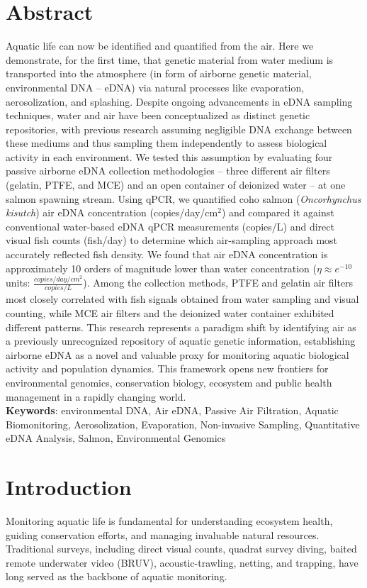 \documentclass{article}
\begin{document}
\section*{Abstract}
Aquatic life can now be identified and quantified from the air. Here we demonstrate, for the first time, that genetic material from water medium is transported into the atmosphere (in form of airborne genetic material, environmental DNA --  eDNA) via natural processes like evaporation, aerosolization, and splashing. Despite ongoing advancements in eDNA sampling techniques, water and air have been conceptualized as distinct genetic repositories, with previous research assuming negligible DNA exchange between these mediums and thus sampling them independently to assess biological activity in each environment. We tested this assumption by evaluating four passive airborne eDNA collection methodologies -- three different air filters (gelatin, PTFE, and MCE) and an open container of deionized water -- at one salmon spawning stream. Using qPCR, we quantified coho salmon (\textit{Oncorhynchus kisutch}) air eDNA concentration (copies/day/cm$^2$) and compared it against conventional water-based eDNA qPCR measurements (copies/L) and direct visual fish counts (fish/day) to determine which air-sampling approach most accurately reflected fish density. We found that air eDNA concentration is approximately 10 orders of magnitude lower than water concentration ($\eta \approx e^{-10}$ units: $\frac{copies/day/cm^2}{copies/L}$). Among the collection methods, PTFE and gelatin air filters most closely correlated with fish signals obtained from water sampling and visual counting, while MCE air filters and the deionized water container exhibited different patterns. This research represents a paradigm shift by identifying air as a previously unrecognized repository of aquatic genetic information, establishing airborne eDNA as a novel and valuable proxy for monitoring aquatic biological activity and population dynamics. This framework opens new frontiers for environmental genomics, conservation biology, ecosystem and public health management in a rapidly changing world.\\


\textbf{Keywords}: environmental DNA, Air eDNA, Passive Air Filtration, Aquatic Biomonitoring, Aerosolization, Evaporation, Non-invasive Sampling, Quantitative eDNA Analysis, Salmon, Environmental Genomics

\section{Introduction}
Monitoring aquatic life is fundamental for understanding ecosystem health, guiding conservation efforts, and managing invaluable natural resources. Traditional surveys, including direct visual counts, quadrat survey diving, baited remote underwater video (BRUV), acoustic-trawling, netting, and trapping, have long served as the backbone of aquatic monitoring. 
\end{document}
